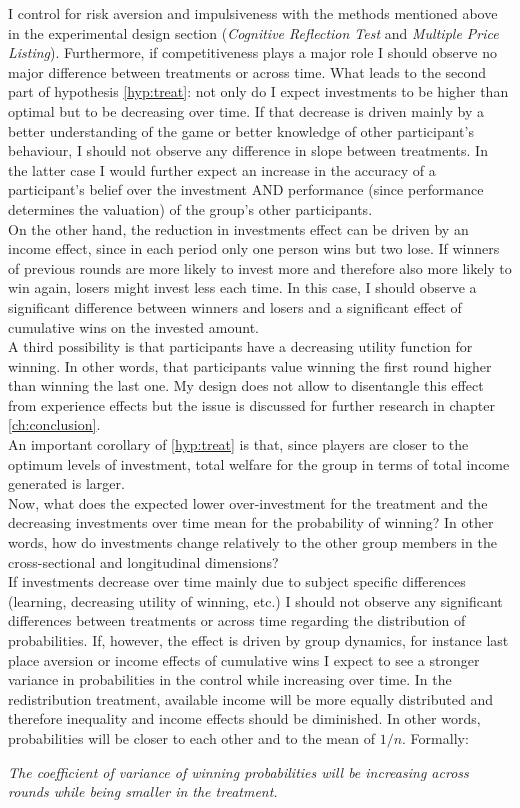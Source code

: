     I control for risk aversion and impulsiveness with the methods mentioned above in the experimental design section (\textit{Cognitive Reflection Test} and \textit{Multiple Price Listing}). Furthermore, if competitiveness plays a major role I should observe no major difference between treatments or across time. What leads to the second part of hypothesis \ref{hyp:treat}: not only do I expect investments to be higher than optimal but to be decreasing over time. If that decrease is driven mainly by a better understanding of the game or better knowledge of other participant's behaviour, I should not observe any difference in slope between treatments. In the latter case I would further expect an increase in the accuracy of a participant's belief over the investment AND performance (since performance determines the valuation) of the group's other participants.\\
    
    On the other hand, the reduction in investments effect can be driven by an income effect, since in each period only one person wins but two lose. If winners of previous rounds are more likely to invest more and therefore also more likely to win again, losers might invest less each time.  In this case, I should observe a significant difference between winners and losers and a significant effect of cumulative wins on the invested amount.\\
    
    A third possibility is that participants have a decreasing utility function for winning. In other words, that participants value winning the first round higher than winning the last one. My design does not allow to disentangle this effect from experience effects but the issue is discussed for further research in chapter \ref{ch:conclusion}.\\
      
    An important corollary of \cref{hyp:treat} is that, since players are closer to the optimum levels of investment, total welfare for the group in terms of total income generated is larger.\\
    
    Now, what does the expected lower over-investment for the treatment and the decreasing investments over time mean for the probability of winning? In other words, how do investments change relatively to the other group members in the cross-sectional and longitudinal dimensions?\\
    
    If investments decrease over time mainly due to subject specific differences (learning, decreasing utility of winning, etc.) I should not observe any significant differences between treatments or across time regarding the distribution of probabilities. If, however, the effect is driven by group dynamics, for instance last place aversion or income effects of cumulative wins I expect to see a stronger variance in probabilities in the control while increasing over time. In the redistribution treatment, available income will be more equally distributed and therefore inequality and income effects should be diminished. In other words, probabilities will be closer to each other and to the mean of $1/n$. Formally:
    
    \begin{hyp}\label{hyp:wins}
    \textit{The coefficient of variance of winning probabilities will be increasing across rounds while being smaller in the treatment.}
    \end{hyp}
    
 
